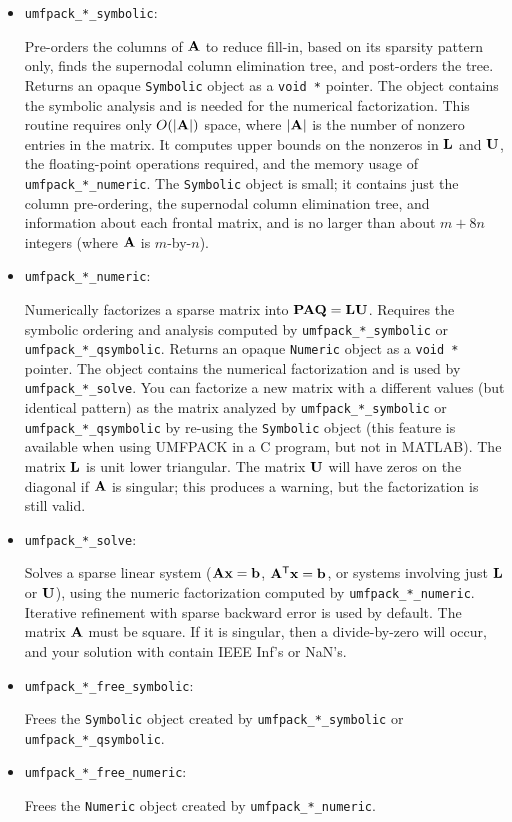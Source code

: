 \begin{itemize}
\item {\tt umfpack\_*\_symbolic}:

    Pre-orders the columns of ${\bf{A}}$ to reduce fill-in, based on its sparsity
    pattern only, finds the supernodal column elimination tree, and post-orders
    the tree.  Returns an opaque {\tt Symbolic} object as a {\tt void *}
    pointer.  The object contains the symbolic analysis and is needed for the
    numerical factorization.  This routine requires only $O(|{\bf{A}}|)$ space,
    where $|{\bf{A}}|$ is the number of nonzero entries in the matrix.  It computes
    upper bounds on the nonzeros in ${\bf{L}}$ and ${\bf{U}}$, the floating-point
    operations required, and the memory usage of {\tt umfpack\_*\_numeric}.  The
    {\tt Symbolic} object is small; it contains just the column pre-ordering,
    the supernodal column elimination tree, and information about each frontal
    matrix, and is no larger than about $m+8n$ integers (where ${\bf{A}}$ is
    $m$-by-$n$).

\item {\tt umfpack\_*\_numeric}:

    Numerically factorizes a sparse matrix into ${\bf{PAQ}}={\bf{LU}}$.  Requires the
    symbolic ordering and analysis computed by {\tt umfpack\_*\_symbolic} or
    {\tt umfpack\_*\_qsymbolic}.  Returns an opaque {\tt Numeric} object as a
    {\tt void *} pointer.  The object contains the numerical factorization and
    is used by {\tt umfpack\_*\_solve}.  You can factorize a new matrix with a
    different values (but identical pattern) as the matrix analyzed by
    {\tt umfpack\_*\_symbolic} or {\tt umfpack\_*\_qsymbolic} by re-using the
    {\tt Symbolic} object (this feature is available when using UMFPACK in a
    C program, but not in MATLAB).
    The matrix ${\bf{L}}$ is unit lower triangular.  The matrix
    ${\bf{U}}$ will have zeros on the diagonal if ${\bf{A}}$ is singular; this
    produces a warning, but the factorization is still valid.

\item {\tt umfpack\_*\_solve}:

    Solves a sparse linear system (${\bf{Ax}}={\bf{b}}$, ${\bf{A}}^{\sf T}{\bf{x}}={\bf{b}}$, or
    systems involving just ${\bf{L}}$ or ${\bf{U}}$), using the numeric factorization
    computed by {\tt umfpack\_*\_numeric}.  Iterative refinement with sparse
    backward error \cite{ardd:89} is used by default.  The matrix ${\bf{A}}$ must
    be square.  If it is singular, then a divide-by-zero will occur, and your
    solution with contain IEEE Inf's or NaN's.

\item {\tt umfpack\_*\_free\_symbolic}:

    Frees the {\tt Symbolic} object created by {\tt umfpack\_*\_symbolic}
    or \newline
    {\tt umfpack\_*\_qsymbolic}.

\item {\tt umfpack\_*\_free\_numeric}:

    Frees the {\tt Numeric} object created by {\tt umfpack\_*\_numeric}.

\end{itemize}

